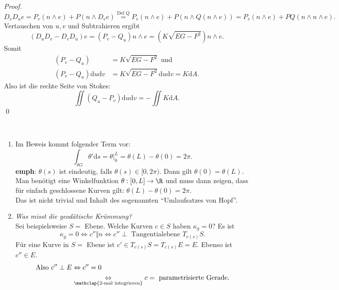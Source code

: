 \begin{theorem}
\begin{proof}
    \begin{equation*}
      D_vD_ue = P_v(n \wedge e) + P(n \wedge D_v e) \overset{\text{Def }Q}{=} P_v(n \wedge e) + P(n \wedge Q(n \wedge e)) = P_v(n \wedge e) + PQ(n \wedge n \wedge e)\text{.}
    \end{equation*}
    Vertauschen von $ u,v $ und Subtrahieren ergibt
    \begin{equation*}
      (D_uD_v - D_vD_u)e = (P_v - Q_u)n \wedge e = (K\sqrt{EG - F^2})n \wedge e\text{.}
    \end{equation*}
    Somit
    \begin{align*}
      (P_v - Q_u) &= K\sqrt{EG - F^2} \text{ und} \\
      (P_v - Q_u)\text{d}u\text{d}v &= K\sqrt{EG - F^2}\text{d}u\text{d}v = K\text{d}A\text{.}
    \end{align*}
    Also ist die rechte Seite von Stokes:
    \begin{equation*}
      \iint(Q_u - P_v)\text{d}u\text{d}v = -\iint K\text{d}A\text{.}
    \end{equation*}
    \qed
  \end{proof}
\end{theorem}

\begin{remark}
  \
  \begin{enumerate}
    \item Im Beweis kommt folgender Term vor:
    \begin{equation*}
      \int_{\delta G}\theta' \text{d}s = \theta \vert_0^L = \theta(L) - \theta(0) = 2\pi\text{.}
    \end{equation*}
    \textbf{emph}: \( \theta(s) \) ist eindeutig, falls \( \theta(s) \in [0,2\pi) \). Dann gilt \( \theta(0) = \theta(L) \). \\
    Man benötigt eine Winkelfunktion \( \theta: [0,L] \to \R \) und muss dann zeigen, dass für einfach geschlossene Kurven gilt: \( \theta(L) - \theta(0) = 2\pi \). \\
    Das ist nicht trivial und Inhalt des sogenannten ``Umlaufsatzes von Hopf''.

    \item \emph{Was misst die geodätische Krümmung?} \\
    Sei beispielsweise \( S = \) Ebene. Welche Kurven \( c \in S \) haben \( \kappa_g = 0 \)? Es ist
    \begin{equation*}
      \kappa_g = 0 \Leftrightarrow c'' \Vert n \Leftrightarrow c'' \perp \text{ Tangentialebene } T_{c(s)}S\text{.}
    \end{equation*}
    Für eine Kurve in \( S = \) Ebene ist \( c' \in T_{c(s)}S = T_{c(s)}E = E \). Ebenso ist \( c'' \in E \).
    \begin{align*}
      \text{Also } c'' \perp E &\Leftrightarrow c'' = 0 \\
       &\underset{\mathclap{\text{2-mal integrieren}}}{\Leftrightarrow} c = \text{ parametrisierte Gerade.}
    \end{align*}
  \end{enumerate}  
\end{remark}

